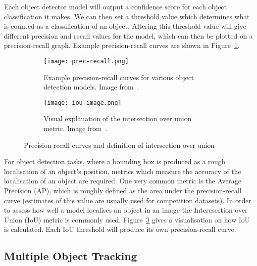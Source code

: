 \documentclass[../interim.tex]{subfiles}
\begin{document}
Each object detector model will output a confidence score for each object classification it makes. We can then set a threshold value which determines what is counted as a classification of an object. Altering this threshold value will give different precision and recall values for the model, which can then be plotted on a precision-recall graph. Example precision-recall curves are shown in Figure~\ref{fig:prec-recall}.

\begin{figure}
  \centering
  \begin{subfigure}{0.48\textwidth}
    \texttt{[image: prec-recall.png]}
    \caption{Example precision-recall curves for various object detection models. Image from~\cite{yolo}.}
    \label{fig:prec-recall}
  \end{subfigure}
  \hfill
  \begin{subfigure}{0.48\textwidth}
    \texttt{[image: iou-image.png]}
    \caption{Visual explanation of the intersection over union metric. Image from~\cite{iou-image}.}
    \label{fig:iou}
  \end{subfigure}
  \caption{Precision-recall curves and definition of intersection over union}
\end{figure}

For object detection tasks, where a bounding box is produced as a rough localisation of an object's position, metrics which measure the accuracy of the localisation of an object are required. One very common metric is the Average Precision (AP), which is roughly defined as the area under the precision-recall curve (estimates of this value are usually used for competition datasets). In order to assess how well a model localises an object in an image the Interesection over Union (IoU) metric is commonly used. Figure~\ref{fig:iou} gives a visualisation on how IoU is calculated. Each IoU threshold will produce its own precision-recall curve.


\subsection{Multiple Object Tracking}
\end{document}

